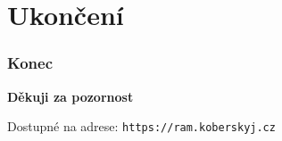 \documentclass{beamer}
\begin{document}
\section{Ukončení}
\begin{frame}
	\frametitle{Konec}

    \bigskip
    \bigskip
    \bigskip
    \bigskip
    \bigskip
    \bigskip
    \bigskip
    \begin{center}
        \textbf{Děkuji za pozornost}
    \end{center}
    \bigskip
    \bigskip
    \bigskip
    \bigskip
    \bigskip
    \bigskip
    \bigskip
    Dostupné na adrese: \texttt{https://ram.koberskyj.cz}
\end{frame}
\end{document}
